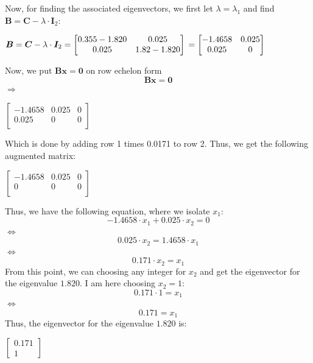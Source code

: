 \documentclass{report}
\begin{document}
Now, for finding the associated eigenvectors, we first let $\lambda = \lambda_1$ and find $\bm{B} = \bm{C} - \lambda \cdot \bm{I}_2$:
\begin{center}
    \begin{math}
        \bm{B} = \bm{C} - \lambda \cdot \bm{I}_2 =
        \begin{bmatrix}
            0.355 - 1.820 & 0.025 \\
            0.025 & 1.82 - 1.820
        \end{bmatrix}
        \newline =
        \begin{bmatrix}
            -1.4658 & 0.025 \\
            0.025 & 0 \\
        \end{bmatrix}
    \end{math}
\end{center}
Now, we put $\bm{B} \bm{x} = \bm{0}$ on row echelon form
$$\bm{B} \bm{x} = \bm{0}$$
$\Rightarrow$
\begin{center}
    \begin{math}
        \left[
            \begin{array}{cc|c}
                -1.4658 & 0.025 & 0 \\
                0.025 & 0 & 0 \\
            \end{array}
        \right]
    \end{math}
\end{center}
Which is done by adding row 1 times 0.0171 to row 2. Thus, we get the following augmented matrix:
\begin{center}
    \begin{math}
        \left[
            \begin{array}{cc|c}
                -1.4658 & 0.025 & 0 \\
                0 & 0 & 0 \\
            \end{array}
        \right]
    \end{math}
\end{center}
Thus, we have the following equation, where we isolate $x_1$:
$$-1.4658 \cdot x_1 + 0.025 \cdot x_2 = 0$$
$\Leftrightarrow$
$$0.025 \cdot x_2 = 1.4658 \cdot x_1$$
$\Leftrightarrow$
$$0.171 \cdot x_2 = x_1$$
From this point, we can choosing any integer for $x_2$ and get the eigenvector for the eigenvalue $1.820$. I am here choosing $x_2 = 1$:
$$0.171 \cdot 1 = x_1$$
$\Leftrightarrow$
$$0.171 = x_1$$
Thus, the eigenvector for the eigenvalue $1.820$ is:
\begin{center}
    \begin{math}
        \left[
            \begin{array}{c}
                0.171 \\
                1
            \end{array}
        \right]
    \end{math}
\end{center}
\end{document}
